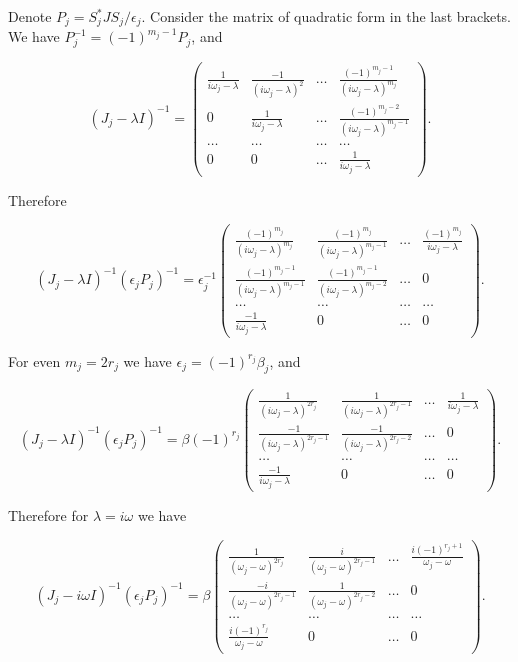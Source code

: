 \documentclass[11pt, reqno]{amsart}
\theoremstyle{plain}
\begin{document}
Denote $P_{j}=S_{j}^{*}JS_{j}/\epsilon_{j}$.
Consider the matrix of quadratic form in the last brackets. We have $P_{j}^{-1}=(-1)^{m_{j}-1}P_{j}$, and 

$$ (J_{j}-\lambda I)^{-1} = 
\left(\begin{array}{cccc}
\frac{1}{i\omega_{j}-\lambda} & \frac{-1}{(i\omega_{j}-\lambda)^{2}} & \ldots & \frac{(-1)^{m_{j}-1}}{(i\omega_{j}-\lambda)^{m_{j}}} \\
0 & \frac{1}{i\omega_{j}-\lambda} & \ldots & \frac{(-1)^{m_{j}-2}}{(i\omega_{j}-\lambda)^{m_{j}-1}} \\
\ldots & \ldots & \ldots & \ldots \\ 0 & 0 & \ldots & 
\frac{1}{i\omega_{j}-\lambda} \end{array}\right).$$

Therefore 

$$ (J_{j}-\lambda I)^{-1}(\epsilon_{j}P_{j})^{-1} = 
\epsilon_{j}^{-1}\left(\begin{array}{cccc}
\frac{(-1)^{m_{j}}}{(i\omega_{j}-\lambda)^{m_{j}}} & 
\frac{(-1)^{m_{j}}}{(i\omega_{j}-\lambda)^{m_{j}-1}} & \ldots & \frac{(-1)^{m_{j}}}{i\omega_{j}-\lambda} \\ 
\frac{(-1)^{m_{j}-1}}{(i\omega_{j}-\lambda)^{m_{j}-1}} & 
\frac{(-1)^{m_{j}-1}}{(i\omega_{j}-\lambda)^{m_{j}-2}} & \ldots & 0 \\
\ldots & \ldots & \ldots & \ldots  \\
\frac{-1}{i\omega_{j}-\lambda} & 0 & \ldots & 0 \end{array}\right).
$$

For even $m_{j}=2r_{j}$ we have $\epsilon_{j}=(-1)^{r_{j}}\beta_{j}$, and 

$$ (J_{j}-\lambda I)^{-1}(\epsilon_{j}P_{j})^{-1} = 
\beta (-1)^{r_{j}} \left(\begin{array}{cccc}
\frac{1}{(i\omega_{j}-\lambda)^{2r_{j}}} & 
\frac{1}{(i\omega_{j}-\lambda)^{2r_{j}-1}} & \ldots & \frac{1}{i\omega_{j}-\lambda} \\ 
\frac{-1}{(i\omega_{j}-\lambda)^{2r_{j}-1}} & 
\frac{-1}{(i\omega_{j}-\lambda)^{2r_{j}-2}} & \ldots & 0 \\
\ldots & \ldots & \ldots & \ldots  \\
\frac{-1}{i\omega_{j}-\lambda} & 0 & \ldots & 0 \end{array}\right).
$$

Therefore for $\lambda = i\omega$ we have

$$ (J_{j}-i\omega I)^{-1}(\epsilon_{j}P_{j})^{-1} = 
\beta \left(\begin{array}{cccc}
\frac{1}{(\omega_{j}-\omega)^{2r_{j}}} & 
\frac{i}{(\omega_{j}-\omega)^{2r_{j}-1}} & \ldots & \frac{i(-1)^{r_{j}+1}}{\omega_{j}-\omega} \\ 
\frac{-i}{(\omega_{j}-\omega)^{2r_{j}-1}} & 
\frac{1}{(\omega_{j}-\omega)^{2r_{j}-2}} & \ldots & 0 \\
\ldots & \ldots & \ldots & \ldots  \\
\frac{i(-1)^{r_{j}}}{\omega_{j}-\omega} & 0 & \ldots & 0 \end{array}\right).
$$
\end{document}

